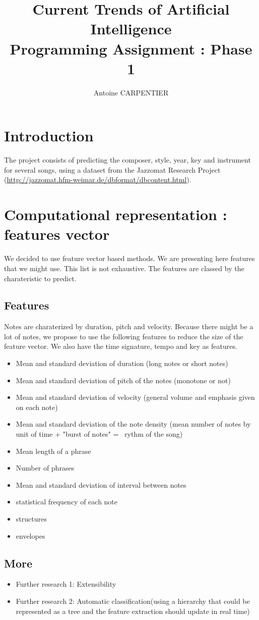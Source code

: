\documentclass[a4paper,12pt]{article}
\author{Antoine CARPENTIER}
\title{Current Trends of Artificial Intelligence\\ \small Programming Assignment : Phase 1}
\begin{document}
\maketitle

\section{Introduction}

The project consists of predicting the composer, style, year, key and instrument for several songs, using a dataset from the Jazzomat Research Project (\url{http://jazzomat.hfm-weimar.de/dbformat/dbcontent.html}).

\section{Computational representation : features vector}

We decided to use feature vector based methods. We are presenting here features that we might use. This list is not exhaustive. The features are classed by the charateristic to predict.

\subsection{Features}
    Notes are charaterized by duration, pitch and velocity. Because there might be a lot of notes, we propose to use the following features to reduce the size of the feature vector. We also have the time signature, tempo and key as features.

    \begin{itemize}
        \item Mean and standard deviation of duration (long notes or short notes)
        \item Mean and standard deviation of pitch of the notes (monotone or not)
        \item Mean and standard deviation of velocity (general volume and emphasis given on each note)
        \item Mean and standard deviation of the note density (mean number of notes by unit of time + "burst of notes" =~ rythm of the song) 
        \item Mean length of a phrase
        \item Number of phrases
        \item Mean and standard deviation of interval between notes
        \item statistical frequency of each note 
        \item structures
        \item envelopes
    \end{itemize}

\subsection{More}

\begin{itemize}
    \item Further research 1: Extensibility
    \item Further research 2: Automatic classification(using a hierarchy that could be represented as a tree and the feature extraction should update in real time)
\end{itemize}


\end{document}
